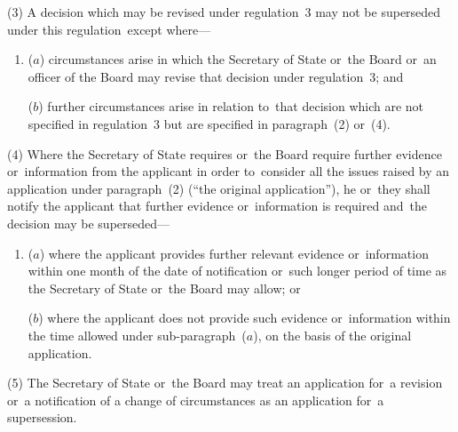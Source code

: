 \documentclass[12pt,a4paper]{article}
\begin{document}
(3) A decision which may be revised under regulation~3 may not be superseded under this regulation~except where—
\begin{enumerate}\item[]
($a$) circumstances arise in which the Secretary of State 
or~the Board or~an officer of the Board  %
may revise that decision under regulation~3; and

($b$) further circumstances arise in relation to~that decision which are not specified in regulation~3 but are specified in paragraph~(2) or~(4).
\end{enumerate}

(4) Where the Secretary of State requires 
or~the Board require  %
further evidence or~information from the applicant in order to~consider all the issues raised by an application under paragraph~(2) (“the original application”), he 
or~they  %
shall notify the applicant that further evidence or~information is required and~the decision may be superseded—
\begin{enumerate}\item[]
($a$) where the applicant provides further relevant evidence or~information within one month of the date of notification or~such longer period of time as the Secretary of State 
or~the Board  %
may allow; or

($b$) where the applicant does not provide such evidence or~information within the time allowed under sub-paragraph~($a$), on the basis of the original application.
\end{enumerate}

(5) The Secretary of State 
or~the Board  %
may treat an application for~a revision or~a notification of a change of circumstances as an application for~a supersession.
\end{document}
